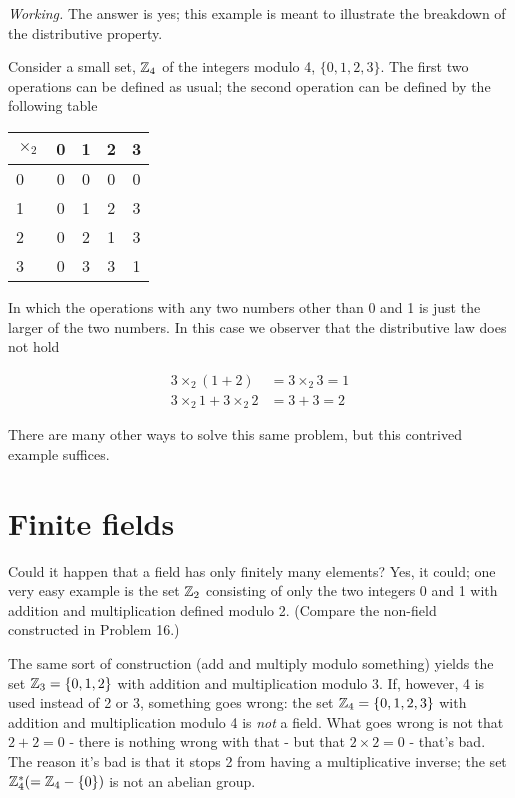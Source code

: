 \textit{Working.} The answer is yes; this example is meant to illustrate the breakdown of the distributive property.

Consider a small set, $\mathbb{Z}_4$ of the integers modulo 4, $\{0,1,2,3\}$. The first two operations can be defined as usual; the second operation can be defined by the following table

\begin{center}
    \begin{tabular}{l|cccc}
        $\times_2$ & 0 & 1 & 2 & 3 \\
        \hline
        0          & 0 & 0 & 0 & 0 \\
        1          & 0 & 1 & 2 & 3 \\
        2          & 0 & 2 & 1 & 3 \\
        3          & 0 & 3 & 3 & 1
    \end{tabular}
\end{center}

In which the operations with any two numbers other than 0 and 1 is just the larger of the two numbers. In this case we observer that the distributive law does not hold

\begin{align}
    3 \times_2 (1 + 2)          & = 3 \times_2 3 = 1 \\
    3 \times_2 1 + 3 \times_2 2 & = 3 + 3 = 2
\end{align}

There are many other ways to solve this same problem, but this contrived example suffices.

\section{Finite fields}

Could it happen that a field has only finitely many elements? Yes, it could; one very easy example is the set $\mathbb{Z}_2$ consisting of only the two integers 0 and 1 with addition and multiplication defined modulo 2. (Compare the non-field constructed in Problem 16.)

The same sort of construction (add and multiply modulo something) yields the set $\mathbb{Z}_3 = \{0,1,2\}$ with addition and multiplication modulo 3. If, however, 4 is used instead of 2 or 3, something goes wrong: the set $\mathbb{Z}_4 = \{0,1,2,3\}$ with addition and multiplication modulo 4 is \textit{not} a field. What goes wrong is not that $2+2=0$ - there is nothing wrong with that - but that $2 \times 2 = 0$ - that's bad. The reason it's bad is that it stops 2 from having a multiplicative inverse; the set $\mathbb{Z}^*_4 (=\mathbb{Z}_4 -\{0\})$ is not an abelian group.

